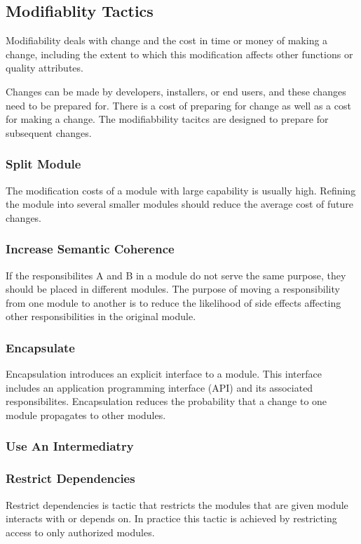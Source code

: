 \documentclass{report}
\begin{document}
\subsection{Modifiablity Tactics}
Modifiability deals with change and the cost in time or money of making a change, including the extent to which this modification affects other functions or quality attributes.

Changes can be made by developers, installers, or end users, and these changes need to be prepared for. There is a cost of preparing for change as well as a cost for making a change. The modifiabbility tacitcs are designed to prepare for subsequent changes.\cite[page 128]{Bass2013}

\subsubsection{Split Module}
The modification costs of a module with large capability is usually high. Refining the module into several smaller modules should reduce the average cost of future changes.

\subsubsection{Increase Semantic Coherence}
If the responsibilites A and B in a module do not serve the same purpose, they should be placed in different modules. The purpose of moving a responsibility from one module to another is to reduce the likelihood of side effects affecting other responsibilities in the original module.

\subsubsection{Encapsulate}
Encapsulation introduces an explicit interface to a module. This interface includes an application programming interface (API) and its associated responsibilites. Encapsulation reduces the probability that a change to one module propagates to other modules.

\subsubsection{Use An Intermediatry}


\subsubsection{Restrict Dependencies}
Restrict dependencies is tactic that restricts the modules that are given module interacts with or depends on. In practice this tactic is achieved by restricting access to only authorized modules.
\end{document}
